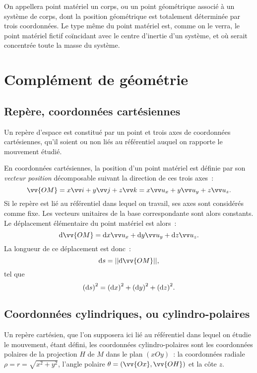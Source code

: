 On appellera point matériel un corps, ou un point géométrique associé à un 
système de corps, dont la position géométrique est totalement déterminée par 
trois coordonnées. Le type même du point matériel est, comme on le verra, le 
point matériel fictif coïncidant avec le centre d'inertie d'un système, et où 
serait concentrée toute la masse du système.

\section{Complément de géométrie}%
\label{chap1-sec:complementdegeometrie}%

\subsection{Repère, coordonnées cartésiennes}%
\label{chap1-subsec:reperecoord}%

Un repère d'espace est constitué par un point et trois axes de coordonnées 
cartésiennes, qu'il soient ou non liés au référentiel auquel on rapporte le 
mouvement étudié.

En coordonnées cartésiennes, la position d'un point matériel est définie par 
son \emph{vecteur position} décomposable suivant la direction de ces trois 
axes~:
\begin{equation}%
  \vv{OM}=x\vi+y\vj+z\vk=x\ux+y\uy+z\uz.%
\end{equation}%
Si le repère est lié au référentiel dans lequel on travail, ses axes sont 
considérés comme fixe. Les vecteurs unitaires de la base correspondante sont 
alors constants. Le déplacement élémentaire du point matériel est alors~:
\begin{equation}%
  \D\vv{OM}=\D x\ux+\D y\uy+\D z\uz.
\end{equation}%
La longueur de ce déplacement est donc~:
\begin{equation}%
  \D s = ||\D\vv{OM}||,
\end{equation}%
tel que
\begin{equation}%
    {(\D s)}^2={(\D x)}^2+{(\D y)}^2+ {(\D z)}^2.
\end{equation}%

\subsection{Coordonnées cylindriques, ou cylindro-polaires}%
\label{chap1-subsec:coordcylindriques}%

Un repère cartésien, que l'on supposera ici lié au référentiel dans lequel on 
étudie le mouvement, étant défini, les coordonnées cylindro-polaires sont les 
coordonnées polaires de la projection \(H\) de \(M\) dans le plan \((xOy)\)~: 
la coordonnées radiale \(\rho=r=\sqrt{x^2+y^2}\), l'angle polaire 
\(\theta=(\vv{Ox}, \vv{OH})\) et la côte \(z\).

